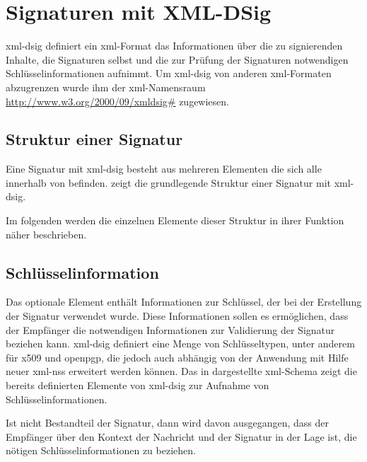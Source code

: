 
\chapter{Signaturen mit XML-DSig}
\label{chap:XML-DSig}
\gls{xml-dsig} definiert ein \gls{xml}-Format das Informationen über die zu signierenden Inhalte, die Signaturen selbst und die zur Prüfung der Signaturen
notwendigen Schlüsselinformationen aufnimmt. Um \gls{xml-dsig} von anderen \gls{xml}-Formaten abzugrenzen wurde ihm der \gls{xml}-Namensraum
\url{http://www.w3.org/2000/09/xmldsig#} zugewiesen. 

\section{Struktur einer Signatur}
Eine Signatur mit \gls{xml-dsig} besteht aus mehreren Elementen die sich alle innerhalb von  befinden.  zeigt
die grundlegende Struktur einer Signatur mit \gls{xml-dsig}.



Im folgenden werden die einzelnen Elemente dieser Struktur in ihrer Funktion näher beschrieben. 

\section{Schlüsselinformation}
Das optionale Element  enthält Informationen zur Schlüssel, der bei der Erstellung der Signatur verwendet wurde. Diese Informationen sollen es
ermöglichen, dass der Empfänger die notwendigen Informationen zur Validierung der Signatur beziehen kann. \gls{xml-dsig} definiert eine Menge von
Schlüsseltypen, unter anderem für \gls{x509} und \gls{openpgp}, die jedoch auch abhängig von der Anwendung mit Hilfe neuer \glspl{xml-ns} erweitert werden
können. Das in  dargestellte \gls{xml}-Schema zeigt die bereits definierten Elemente von \gls{xml-dsig} zur Aufnahme von
Schlüsselinformationen.



Ist  nicht Bestandteil der Signatur, dann wird davon ausgegangen, dass der Empfänger über den Kontext der Nachricht und der Signatur in der
Lage ist, die nötigen Schlüsselinformationen zu beziehen.

